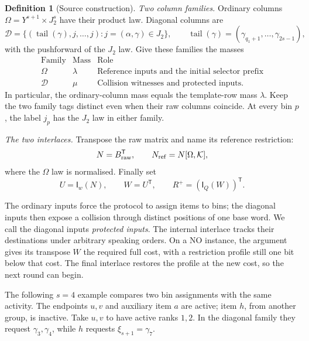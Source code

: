 \documentclass[11pt]{article} \usepackage[utf8]{inputenc}
\theoremstyle{plain} \newtheorem{theorem}{Theorem}[section]
\theoremstyle{definition} \newaliascnt{definition}{theorem}
\newtheorem{definition}[definition]{Definition} \aliascntresetthe{definition}
\newcommand{\Int}[2]{\mathsf{I}_{#1}(#2)}
\begin{document}
\begin{definition}[Source construction]
\smallskip\noindent\textit{Two column families.}
Ordinary columns \(\Omega=Y^{s+1}\times J_2^s\) have their product law.
Diagonal columns are
\[
\mathcal D = \{(\operatorname{tail}(\gamma),j,\ldots,j):j=(\alpha,\gamma)\in
J_2\}, \qquad \operatorname{tail}(\gamma)=(\gamma_{q_1+1},\ldots,\gamma_{2s-1}),
\]
with the pushforward of the \(J_2\) law. Give these families the masses
\[
\begin{array}{ccl}
\text{Family}&\text{Mass}&\text{Role}\\
\Omega&\lambda&\text{Reference inputs and the initial selector prefix}\\
\mathcal D&\mu&\text{Collision witnesses and protected inputs}.
\end{array}
\]
In particular, the ordinary-column mass equals the template-row mass
\(\lambda\). Keep the two family tags distinct even when their raw columns
coincide. At every bin \(p\), the label \(j_p\) has the \(J_2\) law in
either family.

\smallskip\noindent\textit{The two interlaces.}
Transpose the raw matrix and name its reference restriction:
\[
N=B_{\rm raw}^{\mathsf T},\qquad
N_{\rm ref}=N[\Omega,\mathcal K],
\]
where the \(\Omega\) law is normalised. Finally set
\[
U=\Int{w}{N},\qquad W=U^{\mathsf T},\qquad
R^+=(\Int{Q}{W})^{\mathsf T}.
\]
\end{definition}

The ordinary inputs force the protocol to assign items to bins; the diagonal
inputs then expose a collision through distinct positions of one base word.
We call the diagonal inputs \emph{protected inputs}. The internal interlace
tracks their destinations under arbitrary speaking orders. On a NO instance,
the argument gives its transpose \(W\) the required full cost, with a
restriction profile still one bit below that cost. The final interlace
restores the profile at the new cost, so the next round can begin.

The following \(s=4\) example compares two bin assignments with the same
activity. The endpoints \(u,v\) and auxiliary item \(a\) are active; item
\(h\), from another group, is inactive. Take \(u,v\) to have active ranks
\(1,2\). In the diagonal family they request \(\gamma_3,\gamma_4\), while
\(h\) requests \(\xi_{s+1}=\gamma_7\).
\end{document}
